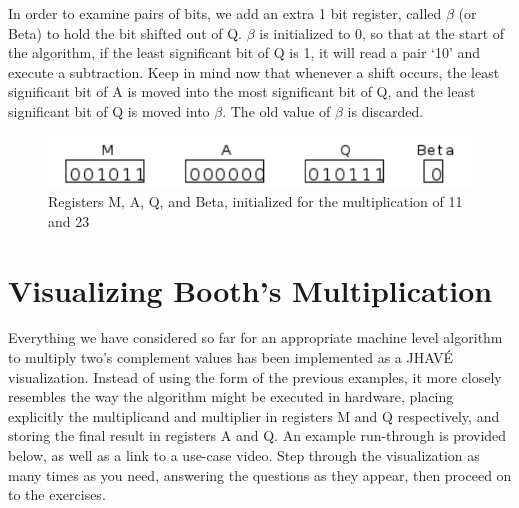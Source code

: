 \documentclass{article}
\begin{document}
    In order to examine pairs of bits, we add an extra 1 bit register, called $\beta$ (or Beta) to hold the bit shifted out of Q.
$\beta$ is initialized to 0, so that at the start of the algorithm, if the least significant bit of Q is 1, it will read a pair `10' and execute a subtraction.
Keep in mind now that whenever a shift occurs, the least significant bit of A is moved into the most significant bit of Q, and the least significant bit of Q is moved into $\beta$.
The old value of $\beta$ is discarded.

\begin{figure}[h]
\centering
\includegraphics{init2.pdf}
\caption{Registers M, A, Q, and Beta, initialized for the multiplication of 11 and 23}
\end{figure}

\section{Visualizing Booth's Multiplication}
Everything we have considered so far for an appropriate machine level algorithm to multiply two's complement values has been implemented as a JHAVÉ visualization.
Instead of using the form of the previous examples, it more closely resembles the way the algorithm might be executed in hardware, placing explicitly the multiplicand and multiplier in registers M and Q respectively, and storing the final result in registers A and Q.
An example run-through is provided below, as well as a link to a use-case video.
Step through the visualization as many times as you need, answering the questions as they appear, then proceed on to the exercises.





%
%
\end{document}

